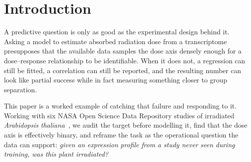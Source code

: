 \documentclass[manuscript,nonacm]{acmart}
\begin{document}


\maketitle


\section{Introduction}
A predictive question is only as good as the experimental design behind it. Asking a
model to estimate absorbed radiation dose from a transcriptome presupposes that the
available data samples the dose axis densely enough for a dose--response relationship to
be identifiable. When it does not, a regression can still be fitted, a correlation can
still be reported, and the resulting number can look like partial success while in fact
measuring something closer to group separation.

This paper is a worked example of catching that failure and responding to it. Working
with six NASA Open Science Data Repository studies of irradiated \emph{Arabidopsis
thaliana}~\cite{osdr}, we audit the target before modelling it, find that the dose axis
is effectively binary, and reframe the task as the operational question the data can
support: \emph{given an expression profile from a study never seen during training, was
this plant irradiated?}
\end{document}
